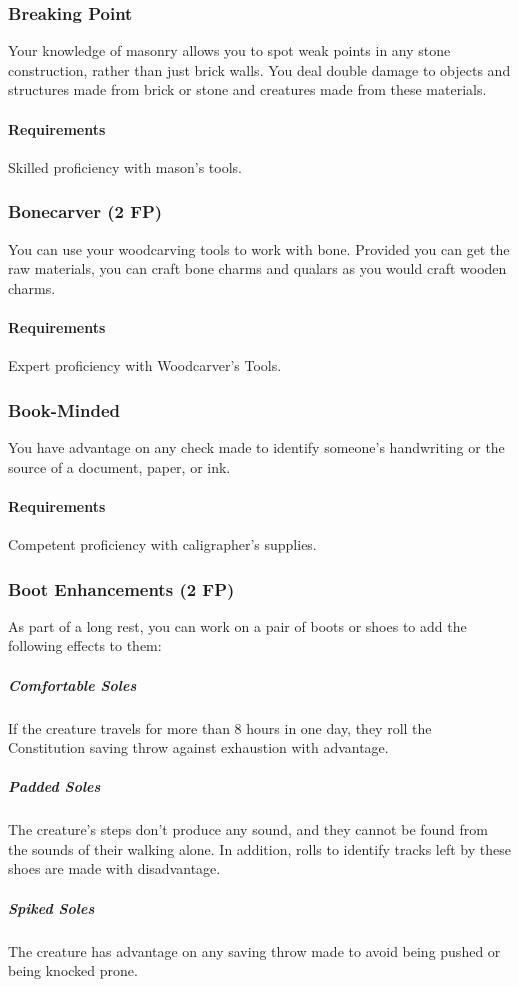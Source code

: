\subsubsection{Breaking Point} \label{feat::breakingpoint}
    Your knowledge of masonry allows you to spot weak points in any stone construction, rather than just brick walls.
    You deal double damage to objects and structures made from brick or stone and creatures made from these materials.
    \paragraph{Requirements} Skilled proficiency with mason's tools.
\subsubsection{Bonecarver (2 FP)} \label{feat::bonecarver}
    You can use your woodcarving tools to work with bone.
    Provided you can get the raw materials, you can craft bone charms and qualars as you would craft wooden charms.
    \paragraph{Requirements} Expert proficiency with Woodcarver's Tools.
\subsubsection{Book-Minded} \label{feat::bookminded}
    You have advantage on any check made to identify someone's handwriting or the source of a document, paper, or ink.
    \paragraph{Requirements} Competent proficiency with caligrapher's supplies.
\subsubsection{Boot Enhancements (2 FP)} \label{feat::bootenhancements}
    As part of a long rest, you can work on a pair of boots or shoes to add the following effects to them:
    \subparagraph{Comfortable Soles} If the creature travels for more than 8 hours in one day, they roll the Constitution saving throw against exhaustion with advantage.
    \subparagraph{Padded Soles} The creature's steps don't produce any sound, and they cannot be found from the sounds of their walking alone.
    In addition, rolls to identify tracks left by these shoes are made with disadvantage.
    \subparagraph{Spiked Soles} The creature has advantage on any saving throw made to avoid being pushed or being knocked prone.


